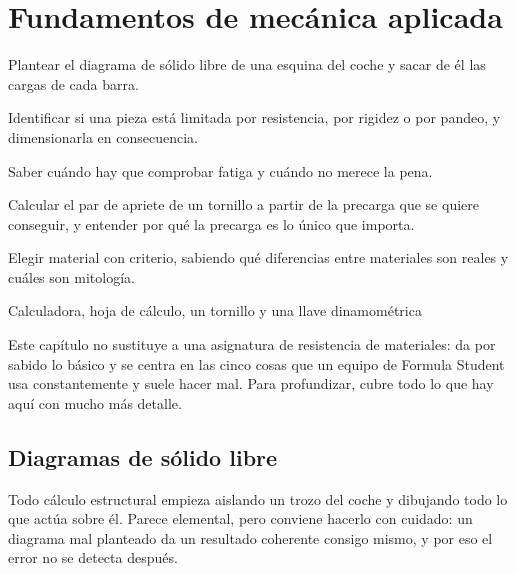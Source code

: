 \chapter{Fundamentos de mecánica aplicada}
\label{ch:mecanica_aplicada}

\begin{objetivos}
  \item Plantear el diagrama de sólido libre de una esquina del coche y sacar de
        él las cargas de cada barra.
  \item Identificar si una pieza está limitada por resistencia, por rigidez o por
        pandeo, y dimensionarla en consecuencia.
  \item Saber cuándo hay que comprobar fatiga y cuándo no merece la pena.
  \item Calcular el par de apriete de un tornillo a partir de la precarga que se
        quiere conseguir, y entender por qué la precarga es lo único que importa.
  \item Elegir material con criterio, sabiendo qué diferencias entre materiales
        son reales y cuáles son mitología.
\end{objetivos}

%
{Calculadora, hoja de cálculo, un tornillo y una llave dinamométrica}

Este capítulo no sustituye a una asignatura de resistencia de materiales: da por
sabido lo básico y se centra en las cinco cosas que un equipo de Formula Student
usa constantemente y suele hacer mal. Para profundizar,
\textcite{budynas_shigley_2020} cubre todo lo que hay aquí con mucho más detalle.

\section{Diagramas de sólido libre}
\label{sec:mecanica_aplicada:01}

Todo cálculo estructural empieza aislando un trozo del coche y dibujando todo lo
que actúa sobre él. Parece elemental, pero conviene hacerlo con cuidado: un
diagrama mal planteado da un resultado coherente consigo mismo, y por eso el
error no se detecta después.

